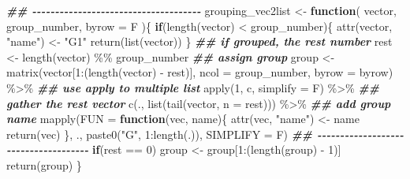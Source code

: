 \documentclass[
]{article}
\newenvironment{Shaded}{\begin{snugshade}}{\end{snugshade}}
\newcommand{\AttributeTok}[1]{\textcolor[rgb]{0.77,0.63,0.00}{#1}}
\newcommand{\ControlFlowTok}[1]{\textcolor[rgb]{0.13,0.29,0.53}{\textbf{#1}}}
\newcommand{\DecValTok}[1]{\textcolor[rgb]{0.00,0.00,0.81}{#1}}
\newcommand{\DocumentationTok}[1]{\textcolor[rgb]{0.56,0.35,0.01}{\textbf{\textit{#1}}}}
\newcommand{\FunctionTok}[1]{\textcolor[rgb]{0.00,0.00,0.00}{#1}}
\newcommand{\NormalTok}[1]{#1}
\newcommand{\OtherTok}[1]{\textcolor[rgb]{0.56,0.35,0.01}{#1}}
\newcommand{\SpecialCharTok}[1]{\textcolor[rgb]{0.00,0.00,0.00}{#1}}
\newcommand{\StringTok}[1]{\textcolor[rgb]{0.31,0.60,0.02}{#1}}
\begin{document}
\begin{Shaded}
\begin{Highlighting}[]
\DocumentationTok{\#\# {-}{-}{-}{-}{-}{-}{-}{-}{-}{-}{-}{-}{-}{-}{-}{-}{-}{-}{-}{-}{-}{-}{-}{-}{-}{-}{-}{-}{-}{-}{-}{-}{-}{-}{-}{-}{-} }
\NormalTok{grouping\_vec2list }\OtherTok{\textless{}{-}} 
  \ControlFlowTok{function}\NormalTok{(}
\NormalTok{           vector,}
\NormalTok{           group\_number,}
           \AttributeTok{byrow =}\NormalTok{ F}
\NormalTok{           )\{}
    \ControlFlowTok{if}\NormalTok{(}\FunctionTok{length}\NormalTok{(vector) }\SpecialCharTok{\textless{}}\NormalTok{ group\_number)\{}
      \FunctionTok{attr}\NormalTok{(vector, }\StringTok{"name"}\NormalTok{) }\OtherTok{\textless{}{-}} \StringTok{"G1"}
      \FunctionTok{return}\NormalTok{(}\FunctionTok{list}\NormalTok{(vector))}
\NormalTok{    \}}
    \DocumentationTok{\#\# if grouped, the rest number}
\NormalTok{    rest }\OtherTok{\textless{}{-}} \FunctionTok{length}\NormalTok{(vector) }\SpecialCharTok{\%\%}\NormalTok{ group\_number}
    \DocumentationTok{\#\# assign group}
\NormalTok{    group }\OtherTok{\textless{}{-}} \FunctionTok{matrix}\NormalTok{(vector[}\DecValTok{1}\SpecialCharTok{:}\NormalTok{(}\FunctionTok{length}\NormalTok{(vector) }\SpecialCharTok{{-}}\NormalTok{ rest)],}
                    \AttributeTok{ncol =}\NormalTok{ group\_number,}
                    \AttributeTok{byrow =}\NormalTok{ byrow) }\SpecialCharTok{\%\textgreater{}\%} 
      \DocumentationTok{\#\# use apply to multiple list}
      \FunctionTok{apply}\NormalTok{(}\DecValTok{1}\NormalTok{, c, }\AttributeTok{simplify =}\NormalTok{ F) }\SpecialCharTok{\%\textgreater{}\%} 
      \DocumentationTok{\#\# gather the rest vector}
      \FunctionTok{c}\NormalTok{(., }\FunctionTok{list}\NormalTok{(}\FunctionTok{tail}\NormalTok{(vector, }\AttributeTok{n =}\NormalTok{ rest))) }\SpecialCharTok{\%\textgreater{}\%} 
      \DocumentationTok{\#\# add group name}
      \FunctionTok{mapply}\NormalTok{(}\AttributeTok{FUN =} \ControlFlowTok{function}\NormalTok{(vec, name)\{}
               \FunctionTok{attr}\NormalTok{(vec, }\StringTok{"name"}\NormalTok{) }\OtherTok{\textless{}{-}}\NormalTok{ name}
               \FunctionTok{return}\NormalTok{(vec)}
\NormalTok{           \}, ., }\FunctionTok{paste0}\NormalTok{(}\StringTok{"G"}\NormalTok{, }\DecValTok{1}\SpecialCharTok{:}\FunctionTok{length}\NormalTok{(.)),}
           \AttributeTok{SIMPLIFY =}\NormalTok{ F)}
    \DocumentationTok{\#\# {-}{-}{-}{-}{-}{-}{-}{-}{-}{-}{-}{-}{-}{-}{-}{-}{-}{-}{-}{-}{-}{-}{-}{-}{-}{-}{-}{-}{-}{-}{-}{-}{-}{-}{-}{-}{-} }
    \ControlFlowTok{if}\NormalTok{(rest }\SpecialCharTok{==} \DecValTok{0}\NormalTok{)}
\NormalTok{      group }\OtherTok{\textless{}{-}}\NormalTok{ group[}\DecValTok{1}\SpecialCharTok{:}\NormalTok{(}\FunctionTok{length}\NormalTok{(group) }\SpecialCharTok{{-}} \DecValTok{1}\NormalTok{)]}
    \FunctionTok{return}\NormalTok{(group)}
\NormalTok{  \}}
\end{Highlighting}
\end{Shaded}
\end{document}
